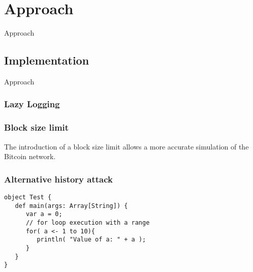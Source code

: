 \chapter{Approach}\label{chapter:approach}
Approach

\section{Implementation}
Approach

\subsection{Lazy Logging}


\subsection{Block size limit}
The introduction of a block size limit allows a more accurate simulation of the Bitcoin network.

\subsection{Alternative history attack}



\begin{lstlisting}[style=myScalastyle]
object Test {
   def main(args: Array[String]) {
      var a = 0;
      // for loop execution with a range
      for( a <- 1 to 10){
         println( "Value of a: " + a );
      }
   }
}
\end{lstlisting}